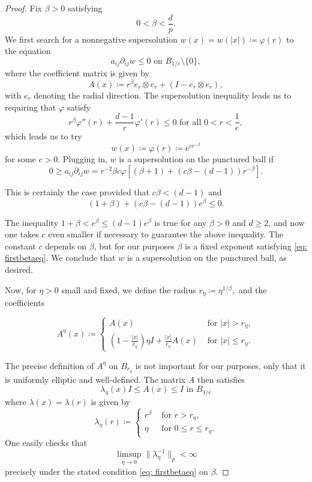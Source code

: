 \documentclass[reqno]{amsart}
\numberwithin{equation}{section}
\numberwithin{equation}{section}
\newcommand{\vphi}{\varphi}
\newcounter{case}
\begin{document}
\begin{proof}
Fix $\beta>0$ satisfying 
\begin{equation}
\label{eq: firstbetaeq}
    0<\beta<\frac dp.
\end{equation}
We first search for a nonnegative supersolution $w(x) = w(|x|) \coloneqq \vphi(r)$ to the equation
$$a_{ij}\partial_{ij} w \le 0 \text{ on } B_{1/e} \setminus \{0\},$$
where the coefficient matrix is given by
$$A(x) \coloneqq r^\beta e_r\otimes e_r + (I-e_r\otimes e_r),$$
with $e_r$ denoting the radial direction. The supersolution inequality leads us to requiring that $\vphi$ satisfy 
$$r^\beta \vphi''(r) + \frac{d-1}{r} \vphi'(r) \le 0 \text{ for all } 0<r<\frac1e,$$
which leads us to try 
$$w(x) \coloneqq \vphi(r) \coloneqq e^{cr^{-\beta}}$$
for some $c>0$. Plugging in, $w$ is a supersolution on the punctured ball if
$$0 \ge a_{ij}\partial_{ij}w = r^{-2}\beta c \vphi\left[(\beta+1) + (c\beta -(d-1))r^{-\beta}\right].$$

This is certainly the case provided that $c\beta<(d-1)$ and
$$(1+\beta) + (c\beta -(d-1))e^{\beta}\le 0.$$

The inequality $1+\beta < e^\beta \le (d-1)e^\beta$ is true for any $\beta>0$ and $d\ge 2$, and now one takes $c$ even smaller if necessary to guarantee the above inequality. The constant $c$ depends on $\beta$, but for our purposes $\beta$ is a fixed exponent satisfying \eqref{eq: firstbetaeq}. We conclude that $w$ is a supersolution on the punctured ball, as desired.

Now, for $\eta>0$ small and fixed, we define the radius $r_\eta \coloneqq \eta^{1/\beta},$
and the coefficients

$$A^\eta(x)\coloneqq \begin{cases} A(x) & \text{ for } |x|>r_\eta, \\ \left(1- \frac{|x|}{r_\eta}\right) \eta I + \frac{|x|}{r_\eta} A(x) &\text{ for } |x|\le r_\eta.\end{cases} $$

The precise definition of $A^\eta$ on $B_{r_\eta}$ is not important for our purposes, only that it is uniformly elliptic and well-defined. The matrix $A$ then satisfies 
$$\lambda_\eta(x) I \le A(x) \le I \text{ in } B_{1/e}$$
where $\lambda(x) = \lambda(r)$ is given by 
$$\lambda_\eta(r) \coloneqq \begin{cases} r^\beta & \text{ for } r > r_\eta, \\  \eta & \text{ for } 0 \le r \le r_\eta.\end{cases}$$
One easily checks that 
$$\limsup_{\eta \to 0} \|\lambda_\eta^{-1}\|_p < \infty$$
precisely under the stated condition \eqref{eq: firstbetaeq} on $\beta$. 


\end{proof}
\end{document}
